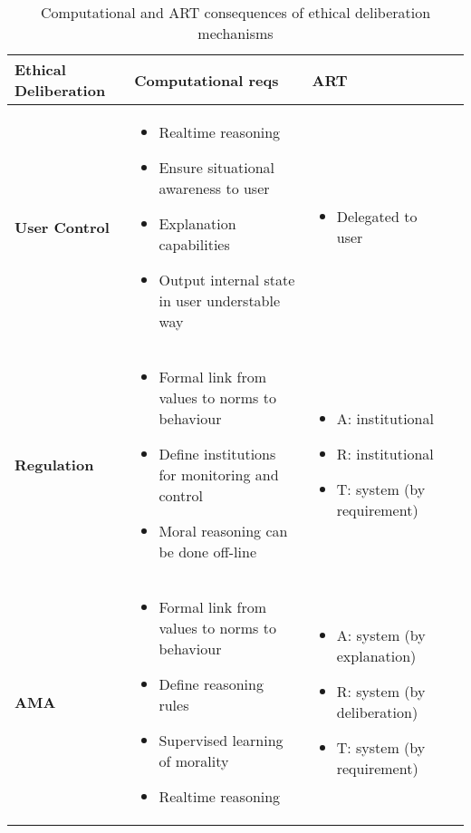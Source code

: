 \documentclass[twocolumn]{article}
\begin{document}
\begin{table*}[t]
\centering
\caption{Computational and ART consequences of ethical deliberation mechanisms}\label{table:reasoning}
\begin{tabular}{|M{2.3cm}|M{8cm}|M{6.5cm}|N} \hline
\textbf{Ethical Deliberation}&\textbf{Computational reqs}&\textbf{ART}&\\[10pt] \hline
\textbf{User Control} &
\begin{itemize}
\item Realtime reasoning
\item Ensure situational awareness to user
\item Explanation capabilities
\item Output internal state in user understable way
\end{itemize} 
& \begin{itemize}
\item Delegated to user 
\end{itemize} 
&\\[10pt] \hline
\textbf{Regulation} & 
\begin{itemize}
\item Formal link from values to norms to behaviour
\item Define institutions for monitoring and control
\item Moral reasoning can be done off-line
\end{itemize} 
& 
\begin{itemize}
\item A: institutional
\item R: institutional
\item T: system (by requirement)
\end{itemize} 
&\\[10pt] \hline
\textbf{AMA} & \begin{itemize}
\item Formal link from values to norms to behaviour
\item Define reasoning rules
\item Supervised learning of morality
\item Realtime reasoning
\end{itemize} 
& 
\begin{itemize}
\item A: system (by explanation)
\item R: system (by deliberation)
\item T: system (by requirement)
\end{itemize} 
&\\[10pt] \hline

\end{tabular}
\end{table*}
\end{document}
